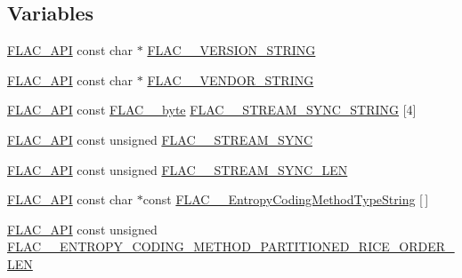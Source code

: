 \subsection*{Variables}
\begin{DoxyCompactItemize}
\item 
\mbox{\hyperlink{group__flac__export_ga56ca07df8a23310707732b1c0007d6f5}{F\+L\+A\+C\+\_\+\+A\+PI}} const char $\ast$ \mbox{\hyperlink{group__flac__format_ga1bd3aa4d4ce0393e51dd55bb3e48fbc1}{F\+L\+A\+C\+\_\+\+\_\+\+V\+E\+R\+S\+I\+O\+N\+\_\+\+S\+T\+R\+I\+NG}}
\item 
\mbox{\hyperlink{group__flac__export_ga56ca07df8a23310707732b1c0007d6f5}{F\+L\+A\+C\+\_\+\+A\+PI}} const char $\ast$ \mbox{\hyperlink{group__flac__format_gac05d5441acd3daad33d287165c450a05}{F\+L\+A\+C\+\_\+\+\_\+\+V\+E\+N\+D\+O\+R\+\_\+\+S\+T\+R\+I\+NG}}
\item 
\mbox{\hyperlink{group__flac__export_ga56ca07df8a23310707732b1c0007d6f5}{F\+L\+A\+C\+\_\+\+A\+PI}} const \mbox{\hyperlink{ordinals_8h_a5eb569b12d5b047cdacada4d57924ee3}{F\+L\+A\+C\+\_\+\+\_\+byte}} \mbox{\hyperlink{group__flac__format_gab988d92256bae952bd337a55da5e89d0}{F\+L\+A\+C\+\_\+\+\_\+\+S\+T\+R\+E\+A\+M\+\_\+\+S\+Y\+N\+C\+\_\+\+S\+T\+R\+I\+NG}} \mbox{[}4\mbox{]}
\item 
\mbox{\hyperlink{group__flac__export_ga56ca07df8a23310707732b1c0007d6f5}{F\+L\+A\+C\+\_\+\+A\+PI}} const unsigned \mbox{\hyperlink{group__flac__format_ga9c002aa5e3dd4f534be5309a6bcfd664}{F\+L\+A\+C\+\_\+\+\_\+\+S\+T\+R\+E\+A\+M\+\_\+\+S\+Y\+NC}}
\item 
\mbox{\hyperlink{group__flac__export_ga56ca07df8a23310707732b1c0007d6f5}{F\+L\+A\+C\+\_\+\+A\+PI}} const unsigned \mbox{\hyperlink{group__flac__format_ga71d8c89809a47f79c8650a2e331436f0}{F\+L\+A\+C\+\_\+\+\_\+\+S\+T\+R\+E\+A\+M\+\_\+\+S\+Y\+N\+C\+\_\+\+L\+EN}}
\item 
\mbox{\hyperlink{group__flac__export_ga56ca07df8a23310707732b1c0007d6f5}{F\+L\+A\+C\+\_\+\+A\+PI}} const char $\ast$const \mbox{\hyperlink{group__flac__format_gaf4f3faf80000ebe7cc357af9bbbaa3b4}{F\+L\+A\+C\+\_\+\+\_\+\+Entropy\+Coding\+Method\+Type\+String}} \mbox{[}$\,$\mbox{]}
\item 
\mbox{\hyperlink{group__flac__export_ga56ca07df8a23310707732b1c0007d6f5}{F\+L\+A\+C\+\_\+\+A\+PI}} const unsigned \mbox{\hyperlink{group__flac__format_ga9839a3378f519e065a3599585e4a9588}{F\+L\+A\+C\+\_\+\+\_\+\+E\+N\+T\+R\+O\+P\+Y\+\_\+\+C\+O\+D\+I\+N\+G\+\_\+\+M\+E\+T\+H\+O\+D\+\_\+\+P\+A\+R\+T\+I\+T\+I\+O\+N\+E\+D\+\_\+\+R\+I\+C\+E\+\_\+\+O\+R\+D\+E\+R\+\_\+\+L\+EN}}

\end{DoxyCompactItemize}

